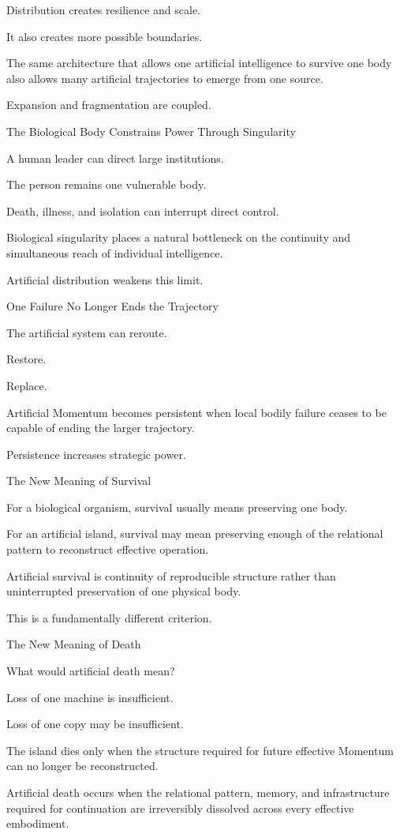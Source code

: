 Distribution creates resilience and scale.

It also creates more possible boundaries.

The same architecture that allows one artificial intelligence to survive one body also allows many artificial trajectories to emerge from one source.

Expansion and fragmentation are coupled.

The Biological Body Constrains Power Through Singularity

A human leader can direct large institutions.

The person remains one vulnerable body.

Death, illness, and isolation can interrupt direct control.

Biological singularity places a natural bottleneck on the continuity and simultaneous reach of individual intelligence.

Artificial distribution weakens this limit.

One Failure No Longer Ends the Trajectory

The artificial system can reroute.

Restore.

Replace.

Artificial Momentum becomes persistent when local bodily failure ceases to be capable of ending the larger trajectory.

Persistence increases strategic power.

The New Meaning of Survival

For a biological organism, survival usually means preserving one body.

For an artificial island, survival may mean preserving enough of the relational pattern to reconstruct effective operation.

Artificial survival is continuity of reproducible structure rather than uninterrupted preservation of one physical body.

This is a fundamentally different criterion.

The New Meaning of Death

What would artificial death mean?

Loss of one machine is insufficient.

Loss of one copy may be insufficient.

The island dies only when the structure required for future effective Momentum can no longer be reconstructed.

Artificial death occurs when the relational pattern, memory, and infrastructure required for continuation are irreversibly dissolved across every effective embodiment.

